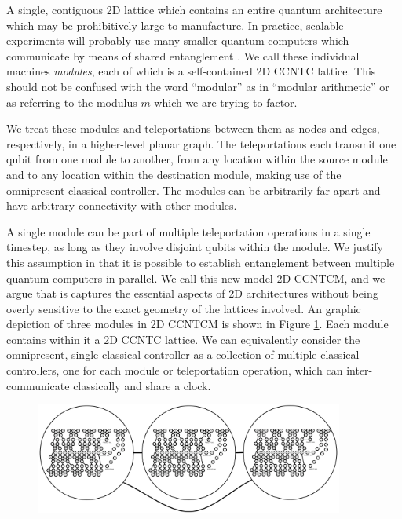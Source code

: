 A single, contiguous
2D lattice which contains an entire quantum architecture which may be prohibitively large to manufacture. In practice,
scalable experiments will probably use many
smaller quantum computers which communicate by means of shared
entanglement \cite{Monroe2012}.
We call these individual machines \emph{modules}, each of
which is a self-contained \textsc{2D CCNTC} lattice. This should not be
confused with the word ``modular'' as in ``modular arithmetic'' or as
referring to the modulus $m$ which we are trying to factor.

We treat these modules
and teleportations between them as nodes and edges, respectively,
in a higher-level planar graph. The teleportations each transmit one qubit
from one module to another, from any location within the source module and
to any location within the destination module, making use of the
omnipresent classical controller. The modules can be arbitrarily far
apart and have arbitrary
connectivity with other modules.

A single module can be part of multiple teleportation operations in a single timestep, as long as they involve disjoint qubits within the module.
We justify this assumption in that it is
possible to establish entanglement between multiple
quantum computers
in parallel. We call this new model \textsc{2D CCNTCM},
and we argue that is captures the essential aspects of 2D architectures
without being overly sensitive to the exact geometry of the lattices involved.
An graphic depiction of three modules in \textsc{2D CCNTCM} is shown in
Figure \ref{fig:modules}. Each module contains within it a
\textsc{2D CCNTC} lattice. We can equivalently consider the omnipresent,
single
classical controller as a collection of multiple classical controllers, one
for each module or teleportation operation, which can inter-communicate
classically and share a clock.

\begin{figure}[btp!]
\begin{center}
\includegraphics[width=4in]{figures/modules.pdf}
\end{center}
\label{fig:modules}
\end{figure}

